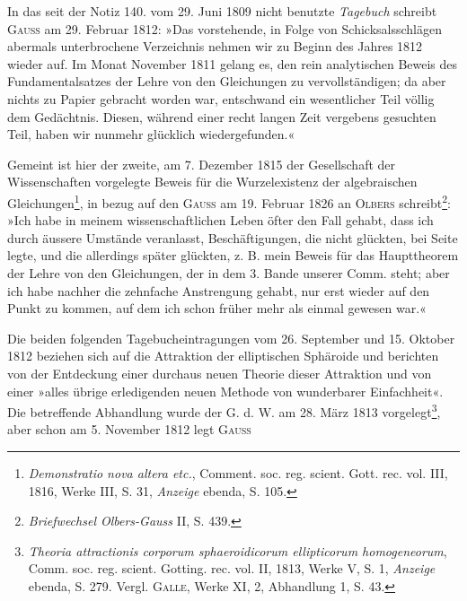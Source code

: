 \par\medskip
\begin{center}
\end{center}
\noindent\hspace*{\parindent}In das seit der Notiz 140. vom 29. Juni 1809 nicht benutzte \textit{Tagebuch}
schreibt \textsc{Gauss} am 29. Februar 1812: »Das vorstehende, in Folge von Schicksalsschlägen
abermals unterbrochene Verzeichnis nehmen wir zu Beginn des
Jahres 1812 wieder auf. Im Monat November 1811 gelang es, den rein analytischen
Beweis des Fundamentalsatzes der Lehre von den Gleichungen zu
vervollständigen; da aber nichts zu Papier gebracht worden war, entschwand
ein wesentlicher Teil völlig dem Gedächtnis. Diesen, während einer recht langen
Zeit vergebens gesuchten Teil, haben wir nunmehr glücklich wiedergefunden.«
\par
Gemeint ist hier der zweite, am 7. Dezember 1815 der Gesellschaft der
Wissenschaften vorgelegte Beweis für die Wurzelexistenz der algebraischen
Gleichungen\footnote{\textit{Demonstratio nova altera etc.}, Comment. soc. reg. scient. Gott. rec. vol. III, 1816, Werke III, S. 31, \textit{Anzeige} ebenda, S. 105.}, in bezug auf den \textsc{Gauss} am 19. Februar 1826 an \textsc{Olbers}
schreibt\footnote{\textit{Briefwechsel Olbers-Gauss} II, S. 439.}: »Ich habe in meinem wissenschaftlichen Leben öfter den Fall
gehabt, dass ich durch äussere Umstände veranlasst, Beschäftigungen, die nicht
glückten, bei Seite legte, und die allerdings später glückten, z. B. mein Beweis
für das Haupttheorem der Lehre von den Gleichungen, der in dem 3.
Bande unserer Comm. steht; aber ich habe nachher die zehnfache Anstrengung
gehabt, nur erst wieder auf den Punkt zu kommen, auf dem ich schon
früher mehr als einmal gewesen war.«
\par
Die beiden folgenden Tagebucheintragungen vom 26. September und
15. Oktober 1812 beziehen sich auf die Attraktion der elliptischen Sphäroide
und berichten von der Entdeckung einer durchaus neuen Theorie dieser Attraktion
und von einer »alles übrige erledigenden neuen Methode von wunderbarer
Einfachheit«. Die betreffende Abhandlung wurde der G. d. W. am
28. März 1813 vorgelegt\footnote{\textit{Theoria attractionis corporum sphaeroidicorum ellipticorum homogeneorum}, Comm. soc. reg. scient. Gotting. rec. vol. II, 1813, Werke V, S. 1, \textit{Anzeige} ebenda, S. 279. Vergl. \textsc{Galle}, Werke XI, 2, Abhandlung 1, S. 43.}, aber schon am 5. November 1812 legt \textsc{Gauss}\par
